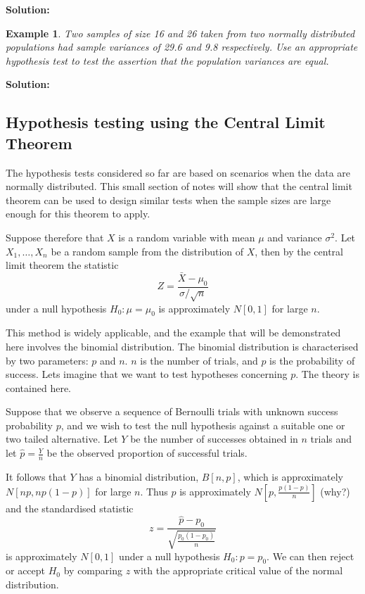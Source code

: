 \documentclass[12pt]{article}
\theoremstyle{break}
\newtheorem{example}[theorem]{Example}
\begin{document}
\begin{mdframed}
\bf{Solution:}
\textcolor[rgb]{1.00,1.00,1.00}{\lipsum[1-4]}
\end{mdframed}

\begin{example}
Two samples of size 16 and 26 taken from two normally distributed populations had sample variances of 29.6 and 9.8 respectively. Use an appropriate hypothesis test to test the assertion that the population variances are equal.
\end{example}

\begin{mdframed}
\bf{Solution:}
\textcolor[rgb]{1.00,1.00,1.00}{\lipsum[1-4]}
\end{mdframed}


\subsection{Hypothesis testing using the Central Limit Theorem}

The hypothesis tests considered so far are based on scenarios when the data are normally distributed. This small section of notes will show that the central limit theorem can be used to design similar tests when the sample sizes are large enough for this theorem to apply.

Suppose therefore that $X$ is a random variable with mean $\mu$ and variance $\sigma^{2}$. Let $X_{1},\ldots,X_{n}$ be a random sample from the distribution of $X$, then by the central limit theorem the statistic $$Z=\frac{\bar{X}-\mu_{0}}{\sigma/\sqrt{n}}$$ under a null hypothesis $H_{0}:\mu=\mu_{0}$ is approximately $N[0,1]$ for large $n$.

This method is widely applicable, and the example that will be demonstrated here involves the binomial distribution. The binomial distribution is characterised by two parameters: $p$ and $n$. $n$ is the number of trials, and $p$ is the probability of success. Lets imagine that we want to test hypotheses concerning $p$. The theory is contained here.

Suppose that we observe a sequence of Bernoulli trials with unknown success probability $p$, and we wish to test the null hypothesis against a suitable one or two tailed alternative. Let $Y$ be the number of successes obtained in $n$ trials and let $\hat{p}=\frac{Y}{n}$ be the observed proportion of successful trials.

It follows that $Y$ has a binomial distribution, $B[n,p]$, which is approximately $N[np,np(1-p)]$ for large $n$. Thus $\hat{p}$ is approximately $N[p,\frac{p(1-p)}{n}]$ (why?) and the standardised statistic $$z=\frac{\hat{p}-p_0}{\sqrt{\frac{p_0(1-p_0)}{n}}}$$ is approximately $N[0,1]$ under a null hypothesis $H_{0}:p=p_0$. We can then reject or accept $H_{0}$ by comparing $z$ with the appropriate critical value of the normal distribution.
\end{document}
